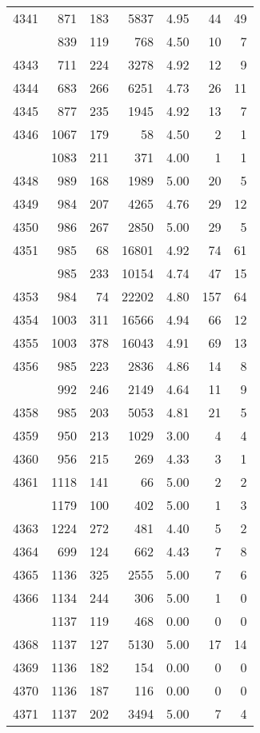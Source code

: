 \documentclass[
]{article}
\begin{document}
\begin{table}
\begin{tabular}[t]{lrrrrrr}
4341 & 871 & 183 & 5837 & 4.95 & 44 & 49\\
\addlinespace
4342 & 839 & 119 & 768 & 4.50 & 10 & 7\\
4343 & 711 & 224 & 3278 & 4.92 & 12 & 9\\
4344 & 683 & 266 & 6251 & 4.73 & 26 & 11\\
4345 & 877 & 235 & 1945 & 4.92 & 13 & 7\\
4346 & 1067 & 179 & 58 & 4.50 & 2 & 1\\
\addlinespace
4347 & 1083 & 211 & 371 & 4.00 & 1 & 1\\
4348 & 989 & 168 & 1989 & 5.00 & 20 & 5\\
4349 & 984 & 207 & 4265 & 4.76 & 29 & 12\\
4350 & 986 & 267 & 2850 & 5.00 & 29 & 5\\
4351 & 985 & 68 & 16801 & 4.92 & 74 & 61\\
\addlinespace
4352 & 985 & 233 & 10154 & 4.74 & 47 & 15\\
4353 & 984 & 74 & 22202 & 4.80 & 157 & 64\\
4354 & 1003 & 311 & 16566 & 4.94 & 66 & 12\\
4355 & 1003 & 378 & 16043 & 4.91 & 69 & 13\\
4356 & 985 & 223 & 2836 & 4.86 & 14 & 8\\
\addlinespace
4357 & 992 & 246 & 2149 & 4.64 & 11 & 9\\
4358 & 985 & 203 & 5053 & 4.81 & 21 & 5\\
4359 & 950 & 213 & 1029 & 3.00 & 4 & 4\\
4360 & 956 & 215 & 269 & 4.33 & 3 & 1\\
4361 & 1118 & 141 & 66 & 5.00 & 2 & 2\\
\addlinespace
4362 & 1179 & 100 & 402 & 5.00 & 1 & 3\\
4363 & 1224 & 272 & 481 & 4.40 & 5 & 2\\
4364 & 699 & 124 & 662 & 4.43 & 7 & 8\\
4365 & 1136 & 325 & 2555 & 5.00 & 7 & 6\\
4366 & 1134 & 244 & 306 & 5.00 & 1 & 0\\
\addlinespace
4367 & 1137 & 119 & 468 & 0.00 & 0 & 0\\
4368 & 1137 & 127 & 5130 & 5.00 & 17 & 14\\
4369 & 1136 & 182 & 154 & 0.00 & 0 & 0\\
4370 & 1136 & 187 & 116 & 0.00 & 0 & 0\\
4371 & 1137 & 202 & 3494 & 5.00 & 7 & 4\\

\end{tabular}
\end{table}
\end{document}
